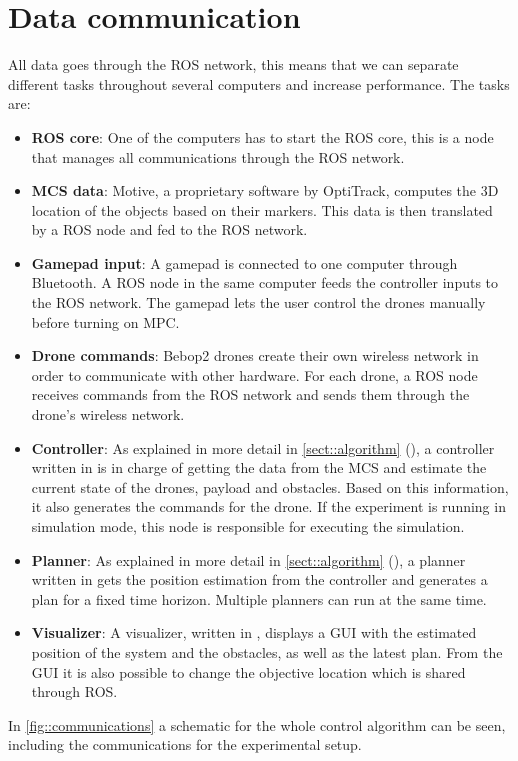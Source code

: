 \section{Data communication}
\label{sect::communication}
All data goes through the \ac{ROS} network, this means that we can separate different tasks throughout several computers and increase performance. The tasks are:
\begin{itemize}
	\item \textbf{\ac{ROS} core}: One of the computers has to start the \ac{ROS} core, this is a node that manages all communications through the \ac{ROS} network.
	\item \textbf{\ac{MCS} data}: Motive, a proprietary software by OptiTrack, computes the 3D location of the objects based on their markers. This data is then translated by a ROS node and fed to the ROS network.
	\item \textbf{Gamepad input}: A gamepad is connected to one computer through Bluetooth. A \ac{ROS} node in the same computer feeds the controller inputs to the \ac{ROS} network. The gamepad lets the user control the drones manually before turning on \ac{MPC}.
	\item \textbf{Drone commands}: Bebop2 drones create their own wireless network in order to communicate with other hardware. For each drone, a \ac{ROS} node receives commands from the \ac{ROS} network and sends them through the drone’s wireless network.
	\item \textbf{Controller}: As explained in more detail in \cref{sect::algorithm} (), a controller written in  is in charge of getting the data from the \ac{MCS} and estimate the current state of the drones, payload and obstacles. Based on this information, it also generates the commands for the drone. If the experiment is running in simulation mode, this node is responsible for executing the simulation.
	\item \textbf{Planner}: As explained in more detail in \cref{sect::algorithm} (), a planner written in  gets the position estimation from the controller and generates a plan for a fixed time horizon. Multiple planners can run at the same time.
	\item \textbf{Visualizer}: A visualizer, written in , displays a \ac{GUI} with the estimated position of the system and the obstacles, as well as the latest plan. From the \ac{GUI} it is also possible to change the objective location which is shared through \ac{ROS}.
\end{itemize}
In \cref{fig::communications} a schematic for the whole control algorithm can be seen, including the communications for the experimental setup.




